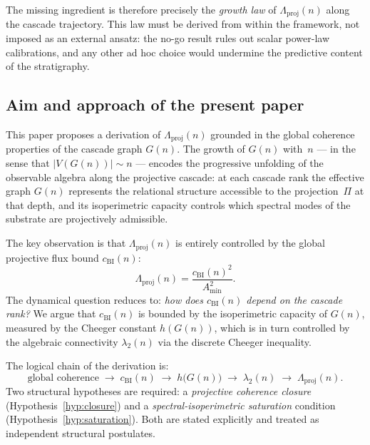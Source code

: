 \documentclass[12pt, a4paper]{article}
\theoremstyle{plain}
\theoremstyle{definition}
\theoremstyle{remark}
\begin{document}
      The missing ingredient is therefore precisely the \emph{growth law} of
      $\Lambda_{\mathrm{proj}}(n)$ along the cascade trajectory.
      This law must be derived from within the framework, not imposed as an external
      ansatz: the no-go result rules out scalar power-law calibrations, and any
      other ad hoc choice would undermine the predictive content of the stratigraphy.

    \subsection{Aim and approach of the present paper}
      \label{sec:intro:aim}

      This paper proposes a derivation of $\Lambda_{\mathrm{proj}}(n)$ grounded in
      the global coherence properties of the cascade graph $G(n)$.
      The growth of $G(n)$ with~$n$ --- in the sense that $|V(G(n))| \sim n$ ---
      encodes the progressive unfolding of the observable algebra along the projective
      cascade: at each cascade rank the effective graph $G(n)$ represents the relational
      structure accessible to the projection~$\Pi$ at that depth, and its isoperimetric
      capacity controls which spectral modes of the substrate are projectively admissible.

      The key observation is that $\Lambda_{\mathrm{proj}}(n)$ is entirely controlled
      by the global projective flux bound $c_{\mathrm{BI}}(n)$:
      \[
        \Lambda_{\mathrm{proj}}(n) = \frac{c_{\mathrm{BI}}(n)^2}{A_{\min}^2}.
      \]
      The dynamical question reduces to: \emph{how does $c_{\mathrm{BI}}(n)$ depend on the
  cascade rank?}
      We argue that $c_{\mathrm{BI}}(n)$ is bounded by the isoperimetric capacity of $G(n)$,
      measured by the Cheeger constant $h(G(n))$, which is in turn controlled by the
      algebraic connectivity $\lambda_2(n)$ via the discrete Cheeger inequality.

      The logical chain of the derivation is:
      \[
        \text{global coherence}
        \;\longrightarrow\; c_{\mathrm{BI}}(n)
        \;\longrightarrow\; h\bigl(G(n)\bigr)
        \;\longrightarrow\; \lambda_2(n)
        \;\longrightarrow\; \Lambda_{\mathrm{proj}}(n).
      \]
      Two structural hypotheses are required: a \emph{projective coherence closure}
      (Hypothesis~\ref{hyp:closure}) and a \emph{spectral-isoperimetric saturation}
      condition (Hypothesis~\ref{hyp:saturation}).
      Both are stated explicitly and treated as independent structural postulates.
\end{document}
